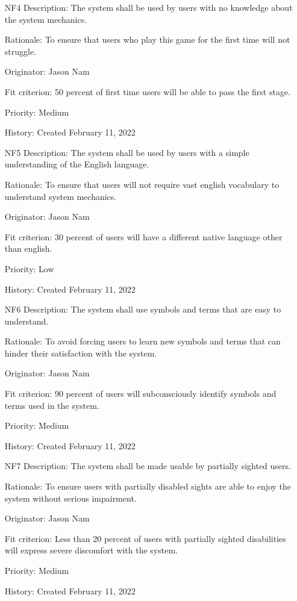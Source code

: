 \documentclass[12pt, titlepage]{article}
\begin{document}
\begin{itemize}
    \item[NF4]
Description: The system shall be used by users with no knowledge about the system mechanics.

Rationale: To ensure that users who play this game for the first time will not struggle.

Originator: Jason Nam

Fit criterion: 50 percent of first time users will be able to pass the first stage.

Priority: Medium

History: Created February 11, 2022

    \item[NF5]
Description: The system shall be used by users with a simple understanding of the English language.

Rationale: To ensure that users will not require vast english vocabulary to understand system mechanics.

Originator: Jason Nam

Fit criterion: 30 percent of users will have a different native language other than english.

Priority: Low

History: Created February 11, 2022

    \item[NF6]
Description: The system shall use symbols and terms that are easy to understand.

Rationale: To avoid forcing users to learn new symbols and terms that can hinder their satisfaction with the system.

Originator: Jason Nam

Fit criterion: 90 percent of users will subconsciously identify symbols and terms used in the system.

Priority: Medium

History: Created February 11, 2022

    \item[NF7]
Description: The system shall be made usable by partially sighted users.

Rationale: To ensure users with partially disabled sights are able to enjoy the system without serious impairment.

Originator: Jason Nam

Fit criterion: Less than 20 percent of users with partially sighted disabilities will express severe discomfort with the system.

Priority: Medium

History: Created February 11, 2022

\end{itemize}
\end{document}
